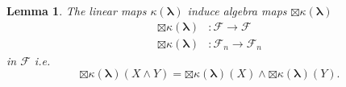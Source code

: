 \documentclass[aps, preprint]{revtex4}
\newtheorem{lemma}[theorem]{Lemma}
\begin{document}
\begin{lemma}
The linear maps $\kappa  \left (\mathbf{\lambda }\right )$ induce algebra maps $ \boxtimes \kappa  \left (\mathbf{\lambda }\right )$
\begin{align} \boxtimes \kappa  \left (\mathbf{\lambda }\right ) &  :\mathcal{F} \rightarrow \mathcal{F} \\
 \boxtimes \kappa  \left (\mathbf{\lambda }\right ) &  :\mathcal{F}_{n} \rightarrow \mathcal{F}_{n}\end{align}in $\mathcal{F}$ i.e.
\begin{equation} \boxtimes \kappa  \left (\mathbf{\lambda }\right ) \left (X \wedge Y\right ) = \boxtimes \kappa  \left (\mathbf{\lambda }\right ) \left (X\right )  \wedge  \boxtimes \kappa  \left (\mathbf{\lambda }\right ) \left (Y\right )\text{.}
\end{equation}



\end{lemma}
\end{document}
